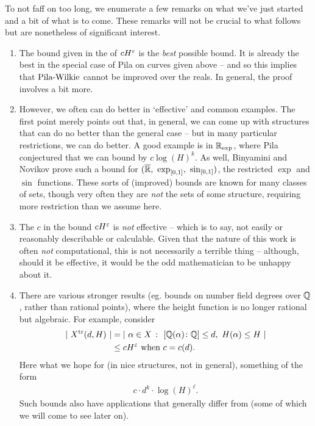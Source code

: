 To not faff on too long, we enumerate a few remarks on what we've just started and a bit of what is to come. These remarks will not be crucial to what follows but are nonetheless of significant interest.
\begin{remark}
\begin{enumerate}
  \item The bound given in the \pwt of $\bound[H]$ is the \emph{best} possible bound. It is already the best in the special case of Pila on curves given above -- and so this implies that $\pw$ cannot be improved over the reals. In general, the proof involves a bit more.

  \item However, we often can do better in `effective' and common examples. The first point merely points out that, in general, we can come up with structures that can do no better than the general case -- but in many particular restrictions, we can do better. A good example is in $\R_{\textrm{exp}}$, where Pila conjectured that we can bound by $c \log{(H)^k}$. As well, Binyamini and Novikov \cite{binyamini_wilkies_2017} prove such a bound for $(\overline{\R}, \ \operatorname{exp}_{[0, 1]}, \ \operatorname{sin}_{[0, 1]})$, the restricted $\operatorname{exp}$ and $\operatorname{sin}$ functions. These sorts of (improved) bounds are known for many classes of sets, though very often they are \emph{not} the  sets of some \om structure, requiring more restriction than we assume here.

  \item The $c$ in the bound $\bound$ is \emph{not} effective -- which is to say, not easily or reasonably describable or calculable. Given that the nature of this work is often \emph{not} computational, this is not necessarily a terrible thing -- although, should it be effective, it would be the odd mathematician to be unhappy about it.

  \item There are various stronger results (eg. bounds on number field degrees over $\Q$, rather than rational points), where the height function is no longer rational but algebraic. For example, consider
      \begin{align*}
        \card{ \ \Xtr (d, H) \ } &= \card{ \ \alpha \in X \ \colon \ [\Q(\alpha) \colon \Q] \leq d, \ H(\alpha) \leq H \ } \\
                                 &\leq \bound[H] \textrm{ when } c = c(d).
      \end{align*}
    Here what we hope for (in nice structures, not in general), something of the form
      \begin{align*}
        c \cdot d^k \cdot \log{(H)}^{\ell}.
      \end{align*}
    Such bounds also have applications that generally differ from \pw (some of which we will come to see later on).


\end{enumerate}
\end{remark}
